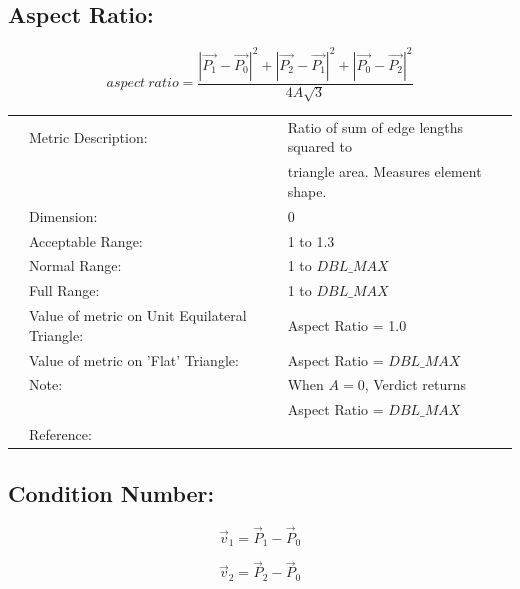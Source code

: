 \documentclass[12pt]{article}
\begin{document}
\subsection*{Aspect Ratio:}

\begin{displaymath}
aspect~ratio = \frac {{|\vec{P_1} - \vec{P_0} |}^{2} +
                            {|\vec{P_2} - \vec{P_1} |}^{2} + 
                            {|\vec{P_0} - \vec{P_2} |}^{2} }
                            {4A \sqrt{3}}
\end{displaymath}

\begin{tabular}{lll}
& Metric Description:  & Ratio of sum of edge lengths squared to \\
&                      & triangle area. Measures element shape. \\
& Dimension:           & 0                      \\ 
& Acceptable Range:    & 1 to 1.3               \\ 
& Normal Range:        & 1 to $DBL\_MAX$                      \\ 
& Full Range:          & 1 to $DBL\_MAX$ \\ 
& Value of metric on Unit Equilateral Triangle:       & Aspect Ratio = 1.0 \\
& Value of metric on 'Flat' Triangle:  & Aspect Ratio = $DBL\_MAX$ \\
& Note:                & When $A = 0$, Verdict returns \\
&                      & Aspect Ratio = $DBL\_MAX$  \\
& Reference:           &  \cite{one}  \cite{two}  \\
\end{tabular} 

\subsection*{Condition Number:}

\begin{displaymath}
\vec v_1 = {\vec P_1 - \vec P_0}
\end{displaymath}

\begin{displaymath}
\vec v_2 = {\vec P_2 - \vec P_0}
\end{displaymath}
\end{document}
